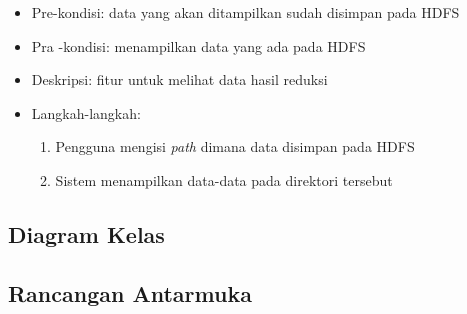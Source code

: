 \begin{enumerate}
\begin{itemize}
\item Pre-kondisi: data yang akan ditampilkan sudah disimpan pada HDFS

\item Pra -kondisi: menampilkan data yang ada pada HDFS

\item Deskripsi: fitur untuk melihat data hasil reduksi

\item Langkah-langkah:

\begin{enumerate}

\item Pengguna mengisi \textit{path} dimana data disimpan pada HDFS

\item Sistem menampilkan data-data pada direktori tersebut

\end{enumerate}

\end{itemize}

\end{enumerate}


\subsection{Diagram Kelas}

\subsection{Rancangan Antarmuka}